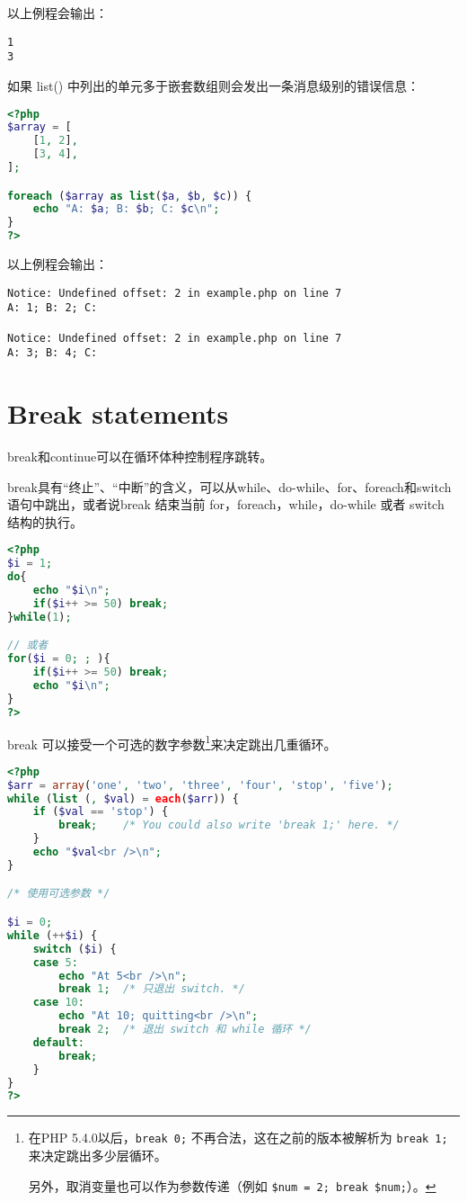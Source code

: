 以上例程会输出：

\begin{verbatim}
1
3
\end{verbatim}

如果 list() 中列出的单元多于嵌套数组则会发出一条消息级别的错误信息：


\begin{lstlisting}[language=PHP]
<?php
$array = [
    [1, 2],
    [3, 4],
];

foreach ($array as list($a, $b, $c)) {
    echo "A: $a; B: $b; C: $c\n";
}
?>
\end{lstlisting}

以上例程会输出：


\begin{verbatim}
Notice: Undefined offset: 2 in example.php on line 7
A: 1; B: 2; C: 

Notice: Undefined offset: 2 in example.php on line 7
A: 3; B: 4; C: 
\end{verbatim}

\section{Break statements}

break和continue可以在循环体种控制程序跳转。

break具有“终止”、“中断”的含义，可以从while、do-while、for、foreach和switch语句中跳出，或者说break 结束当前 for，foreach，while，do-while 或者 switch 结构的执行。

\begin{lstlisting}[language=PHP]
<?php
$i = 1;
do{
	echo "$i\n";
	if($i++ >= 50) break;
}while(1);

// 或者
for($i = 0; ; ){
	if($i++ >= 50) break;
	echo "$i\n";
}
?>
\end{lstlisting}






break 可以接受一个可选的数字参数\footnote{在PHP 5.4.0以后，\texttt{break 0;} 不再合法，这在之前的版本被解析为 \texttt{break 1;}来决定跳出多少层循环。

另外，取消变量也可以作为参数传递（例如 \texttt{\$num = 2; break \$num;}）。}来决定跳出几重循环。


\begin{lstlisting}[language=PHP]
<?php
$arr = array('one', 'two', 'three', 'four', 'stop', 'five');
while (list (, $val) = each($arr)) {
    if ($val == 'stop') {
        break;    /* You could also write 'break 1;' here. */
    }
    echo "$val<br />\n";
}

/* 使用可选参数 */

$i = 0;
while (++$i) {
    switch ($i) {
    case 5:
        echo "At 5<br />\n";
        break 1;  /* 只退出 switch. */
    case 10:
        echo "At 10; quitting<br />\n";
        break 2;  /* 退出 switch 和 while 循环 */
    default:
        break;
    }
}
?>
\end{lstlisting}






